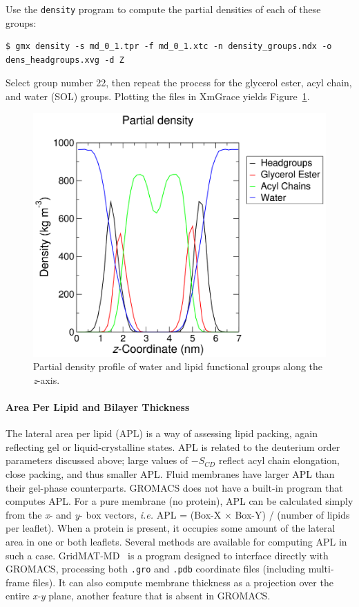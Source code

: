 \documentclass[9pt,tutorial,pubversion]{livecoms}
\begin{document}
Use the \texttt{density} program to compute the partial densities of each of these groups:

\begin{lstlisting}
$ gmx density -s md_0_1.tpr -f md_0_1.xtc -n density_groups.ndx -o dens_headgroups.xvg -d Z
\end{lstlisting}
%
Select group number 22, then repeat the process for the glycerol ester, acyl chain, and water (SOL) groups. Plotting the files in XmGrace yields Figure~\ref{kalp_dppc_dens_fig}.

\begin{figure}[h!]
\centering
\includegraphics{plot_kalp_dppc_density}
\caption{Partial density profile of water and lipid functional groups along the {\em z}-axis.}
\label{kalp_dppc_dens_fig}
\end{figure}

\paragraph{Area Per Lipid and Bilayer Thickness} \label{kalp_ana_apl}

The lateral area per lipid (APL) is a way of assessing lipid packing, again reflecting gel or liquid-crystalline states. APL is related to the deuterium order parameters discussed above; large values of $-S_{CD}$ reflect acyl chain elongation, close packing, and thus smaller APL. Fluid membranes have larger APL than their gel-phase counterparts. GROMACS does not have a built-in program that computes APL. For a pure membrane (no protein), APL can be calculated simply from the {\em x}- and {\em y}- box vectors, {\em i.e.} APL = (Box-X $\times$ Box-Y) / (number of lipids per leaflet). When a protein is present, it occupies some amount of the lateral area in one or both leaflets. Several methods are available for computing APL in such a case. GridMAT-MD~\cite{Allen2009} is a program designed to interface directly with GROMACS, processing both \texttt{.gro} and \texttt{.pdb} coordinate files (including multi-frame files). It can also compute membrane thickness as a projection over the entire {\em x-y} plane, another feature that is absent in GROMACS.
\end{document}
